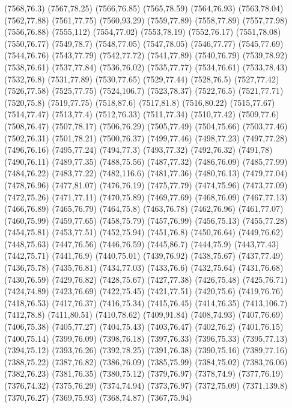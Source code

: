 (7568,76.3)
(7567,78.25)
(7566,76.85)
(7565,78.59)
(7564,76.93)
(7563,78.04)
(7562,77.88)
(7561,77.75)
(7560,93.29)
(7559,77.89)
(7558,77.89)
(7557,77.98)
(7556,76.88)
(7555,112)
(7554,77.02)
(7553,78.19)
(7552,76.17)
(7551,78.08)
(7550,76.77)
(7549,78.7)
(7548,77.05)
(7547,78.05)
(7546,77.77)
(7545,77.69)
(7544,76.76)
(7543,77.79)
(7542,77.72)
(7541,77.89)
(7540,76.79)
(7539,78.92)
(7538,76.61)
(7537,77.84)
(7536,76.02)
(7535,77.77)
(7534,76.61)
(7533,78.43)
(7532,76.8)
(7531,77.89)
(7530,77.65)
(7529,77.44)
(7528,76.5)
(7527,77.42)
(7526,77.58)
(7525,77.75)
(7524,106.7)
(7523,78.37)
(7522,76.5)
(7521,77.71)
(7520,75.8)
(7519,77.75)
(7518,87.6)
(7517,81.8)
(7516,80.22)
(7515,77.67)
(7514,77.47)
(7513,77.4)
(7512,76.33)
(7511,77.34)
(7510,77.42)
(7509,77.6)
(7508,76.47)
(7507,78.17)
(7506,76.29)
(7505,77.49)
(7504,75.66)
(7503,77.46)
(7502,76.31)
(7501,78.21)
(7500,76.37)
(7499,77.46)
(7498,77.23)
(7497,77.28)
(7496,76.16)
(7495,77.24)
(7494,77.3)
(7493,77.32)
(7492,76.32)
(7491,78)
(7490,76.11)
(7489,77.35)
(7488,75.56)
(7487,77.32)
(7486,76.09)
(7485,77.99)
(7484,76.22)
(7483,77.22)
(7482,116.6)
(7481,77.36)
(7480,76.13)
(7479,77.04)
(7478,76.96)
(7477,81.07)
(7476,76.19)
(7475,77.79)
(7474,75.96)
(7473,77.09)
(7472,75.26)
(7471,77.11)
(7470,75.89)
(7469,77.69)
(7468,76.09)
(7467,77.13)
(7466,76.89)
(7465,76.79)
(7464,75.8)
(7463,76.78)
(7462,76.96)
(7461,77.07)
(7460,75.99)
(7459,77.65)
(7458,75.79)
(7457,76.99)
(7456,75.13)
(7455,77.28)
(7454,75.81)
(7453,77.51)
(7452,75.94)
(7451,76.8)
(7450,76.64)
(7449,76.62)
(7448,75.63)
(7447,76.56)
(7446,76.59)
(7445,86.7)
(7444,75.9)
(7443,77.43)
(7442,75.71)
(7441,76.9)
(7440,75.01)
(7439,76.92)
(7438,75.67)
(7437,77.49)
(7436,75.78)
(7435,76.81)
(7434,77.03)
(7433,76.6)
(7432,75.64)
(7431,76.68)
(7430,76.59)
(7429,76.82)
(7428,75.67)
(7427,77.38)
(7426,75.48)
(7425,76.71)
(7424,74.89)
(7423,76.69)
(7422,75.45)
(7421,77.51)
(7420,75.6)
(7419,76.76)
(7418,76.53)
(7417,76.37)
(7416,75.34)
(7415,76.45)
(7414,76.35)
(7413,106.7)
(7412,78.8)
(7411,80.51)
(7410,78.62)
(7409,91.84)
(7408,74.93)
(7407,76.69)
(7406,75.38)
(7405,77.27)
(7404,75.43)
(7403,76.47)
(7402,76.2)
(7401,76.15)
(7400,75.14)
(7399,76.09)
(7398,76.18)
(7397,76.33)
(7396,75.33)
(7395,77.13)
(7394,75.12)
(7393,76.26)
(7392,78.25)
(7391,76.38)
(7390,75.16)
(7389,77.16)
(7388,75.22)
(7387,76.82)
(7386,76.09)
(7385,75.99)
(7384,75.02)
(7383,76.06)
(7382,76.23)
(7381,76.35)
(7380,75.12)
(7379,76.97)
(7378,74.9)
(7377,76.19)
(7376,74.32)
(7375,76.29)
(7374,74.94)
(7373,76.97)
(7372,75.09)
(7371,139.8)
(7370,76.27)
(7369,75.93)
(7368,74.87)
(7367,75.94)
